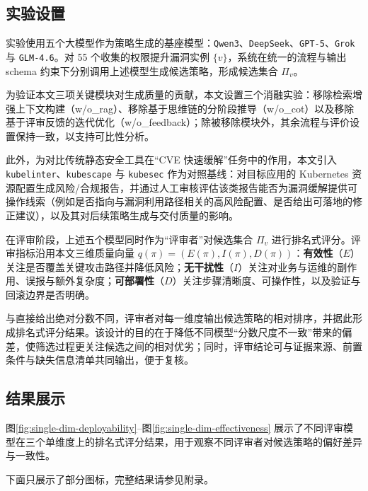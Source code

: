 \subsection{实验设置}

实验使用五个大模型作为策略生成的基座模型：\texttt{Qwen3}、\texttt{DeepSeek}、\texttt{GPT-5}、\texttt{Grok} 与 \texttt{GLM-4.6}。对 55 个收集的权限提升漏洞实例 $\{v\}$，系统在统一的流程与输出 schema 约束下分别调用上述模型生成候选策略，形成候选集合 $\Pi_v$。

为验证本文三项关键模块对生成质量的贡献，本文设置三个消融实验：移除检索增强上下文构建（w/o\_rag）、移除基于思维链的分阶段推导（w/o\_cot）以及移除基于评审反馈的迭代优化（w/o\_feedback）；除被移除模块外，其余流程与评价设置保持一致，以支持可比性分析。

此外，为对比传统静态安全工具在“CVE 快速缓解”任务中的作用，本文引入 \texttt{kubelinter}、\texttt{kubescape} 与 \texttt{kubesec} 作为对照基线：对目标应用的 Kubernetes 资源配置生成风险/合规报告，并通过人工审核评估该类报告能否为漏洞缓解提供可操作线索（例如是否指向与漏洞利用路径相关的高风险配置、是否给出可落地的修正建议），以及其对后续策略生成与交付质量的影响。

在评审阶段，上述五个模型同时作为“评审者”对候选集合 $\Pi_v$ 进行排名式评分。评审指标沿用本文三维质量向量 $q(\pi)=(E(\pi),I(\pi),D(\pi))$：\textbf{有效性}（$E$）关注是否覆盖关键攻击路径并降低风险；\textbf{无干扰性}（$I$）关注对业务与运维的副作用、误报与额外复杂度；\textbf{可部署性}（$D$）关注步骤清晰度、可操作性，以及验证与回滚边界是否明确。

与直接给出绝对分数不同，评审者对每一维度输出候选策略的相对排序，并据此形成排名式评分结果。该设计的目的在于降低不同模型“分数尺度不一致”带来的偏差，使筛选过程更关注候选之间的相对优劣；同时，评审结论可与证据来源、前置条件与缺失信息清单共同输出，便于复核。

\subsection{结果展示}

图\ref{fig:single-dim-deployability}--图\ref{fig:single-dim-effectiveness} 展示了不同评审模型在三个单维度上的排名式评分结果，用于观察不同评审者对候选策略的偏好差异与一致性。

下面只展示了部分图标，完整结果请参见附录。

